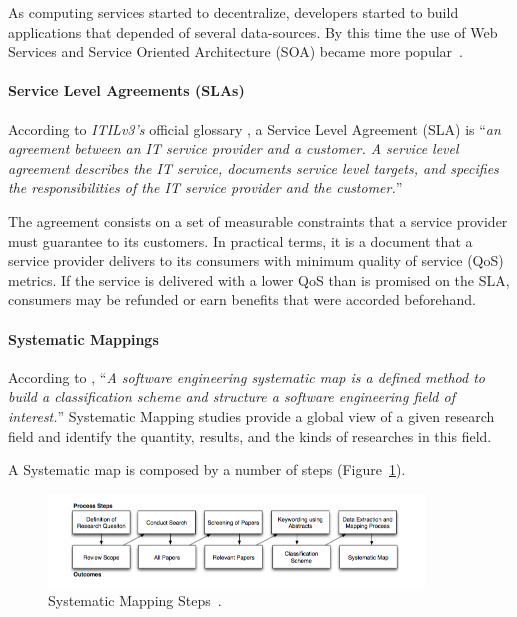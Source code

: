 \documentclass{article}
\begin{document}
As computing services started to decentralize, developers started to build applications that depended of several data-sources. 
By this time the use of Web Services and Service Oriented Architecture (SOA) became more popular~\cite{Armbrust09m.:above}. 


\paragraph*{Service Level Agreements (SLAs)}
According to \textit{ITILv3's} official glossary \cite{itilv3glossary}, a Service Level Agreement (SLA) is ``\textit{an agreement between an IT service provider and a customer. 
A service level agreement describes the IT service, documents service level targets, and specifies the responsibilities of the IT service provider and the customer.}'' 

The agreement consists on a set of measurable constraints that a service provider must guarantee to its customers.
In practical terms, it is a document that a service provider delivers to its consumers with minimum quality of service (QoS) metrics. 
If the service is delivered with a lower QoS than is promised on the SLA, consumers may be refunded or earn benefits that were accorded beforehand.    

\paragraph*{Systematic Mappings}
According to \cite{Petersen:2008:SMS:2227115.2227123}, ``\textit{A software engineering systematic map is a defined method to build a classification scheme and structure a software engineering field of interest.}''
Systematic Mapping studies provide a global view of a given research field and identify the quantity, results, and the kinds of researches in this field.

A Systematic map is composed by a number of steps (Figure~\ref{fig:sms}).
\begin{figure}[ht!]
\centering
\includegraphics[width=100mm]{pic1.png}
\caption{Systematic Mapping Steps~\cite{Petersen:2008:SMS:2227115.2227123}.\label{fig:sms}}
\end{figure}
\end{document}
